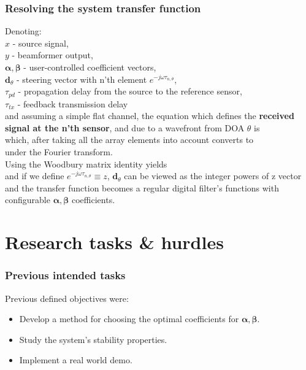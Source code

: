 \documentclass[10pt,pdflatex,headrule,landscape]{beamer}
\newcommand\vecnot[1]{\boldsymbol{#1}}
\begin{document}
\begin{frame}[allowframebreaks]
\frametitle{Resolving the system transfer function}
Denoting:\\
$ x $ - source signal,\\
$ y $ - beamformer output,\\
$ \vecnot{\alpha},\vecnot{\beta} $ - user-controlled coefficient vectors,\\
$\vecnot{d}_{\theta}$ - steering vector with n'th element $e^{-j\omega \tau_{n,\theta}}$,\\
$ \tau_{pd} $ - propagation delay from the source to the reference sensor,\\
$ \tau_{tx} $ - feedback transmission delay\\
and assuming a simple flat channel, the equation which defines the \textbf{received signal at the n'th sensor}, and due to a wavefront from DOA $\theta$ is 
$$

$$
which, after taking all the array elements into account converts to
$$

$$
under the Fourier transform.
\\
Using the Woodbury matrix identity \cite{woodbury1950inverting} yields
$$

$$
and if we define $e^{-j\omega \tau_{n,\theta}} \equiv z $, $\vecnot{d}_{\theta}$ can be viewed as the integer powers of z vector and the transfer function becomes a regular digital filter's functions with configurable $ \vecnot{\alpha},\vecnot{\beta} $ coefficients.

\end{frame}

\section{Research tasks \& hurdles}

\begin{frame}
\frametitle{Previous intended tasks}
Previous defined objectives were:
\begin{itemize}
\item
{
Develop a method for choosing the optimal coefficients for $ \vecnot{\alpha},\vecnot{\beta} $.
}
\item
{
Study the system's stability properties.
}
\item
{
Implement a real world demo.
}
\end{itemize}
\end{frame}
\end{document}
